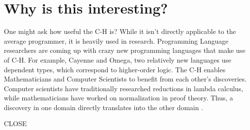 \section{Why is this interesting?}
One might ask how useful the C-H is? While it isn't directly applicable to the average programmer, it is heavily used in research. Programming Language researchers are coming up with crazy new programming languages that make use of C-H. For example, Cayenne and Omega, two relatively new languages use dependent types, which correspond to higher-order logic. The C-H enables Mathematicians and Computer Scientists to benefit from each other's discoveries. Computer scientists have traditionally researched reductions in lambda calculus, while mathematicians have worked on normalization in proof theory. Thus, a discovery in one domain directly translates into the other domain \cite{CHnotes}.

CLOSE
